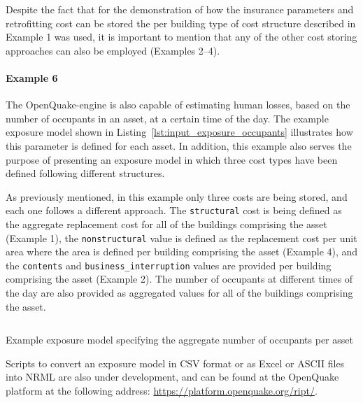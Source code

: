 Despite the fact that for the demonstration of how the insurance parameters
and retrofitting cost can be stored the per building type of cost structure
described in Example 1 was used, it is important to mention that any of the
other cost storing approaches can also be employed (Examples 2--4).


\paragraph{Example 6}

The OpenQuake-engine is also capable of estimating human losses, based on the
number of occupants in an asset, at a certain time of the day. The example
exposure model shown in Listing~\ref{lst:input_exposure_occupants} illustrates
how this parameter is defined for each asset. In addition, this example also
serves the purpose of presenting an \gls{exposure model} in which three cost
types have been defined following different structures.

As previously mentioned, in this example only three costs are being stored,
and each one follows a different approach. The \Verb+structural+ cost is being
defined as the aggregate replacement cost for all of the buildings comprising
the asset (Example 1), the \Verb+nonstructural+ value is defined as the
replacement cost per unit area where the area is defined per building
comprising the asset (Example 4), and the \Verb+contents+ and
\Verb+business_interruption+ values are provided per building comprising the
asset (Example 2). The number of occupants at different times of the day are
also provided as aggregated values for all of the buildings comprising the
asset.

\begin{listing}[htbp]
  \inputminted[firstline=1,firstnumber=1,fontsize=\footnotesize,frame=single,linenos,bgcolor=lightgray]{xml}{oqum/risk/Verbatim/input_exposure_occupants.xml}
  \caption{Example exposure model specifying the aggregate number of occupants per asset}
  \label{lst:input_exposure_occupants}
\end{listing}

Scripts to convert an \gls{exposure model} in CSV format or as Excel or
ASCII files into NRML are also under development, and can be found at the
OpenQuake platform at the following address:
\href{https://platform.openquake.org/ript/}{https://platform.openquake.org/ript/}.
